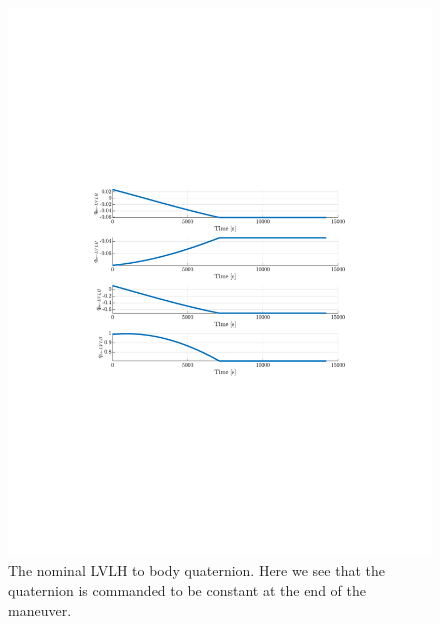 \documentclass[]{article}
\begin{document}
\begin{figure}[!h]
	\centering
	\includegraphics[width=\linewidth,trim={4cm, 8cm, 4cm, 8cm},clip]{figs/P1Q2.pdf}
	\caption{The nominal LVLH to body quaternion. Here we see that the quaternion is commanded to be constant at the end of the maneuver.}
	\label{fig:P1Q2}
\end{figure}
\end{document}

